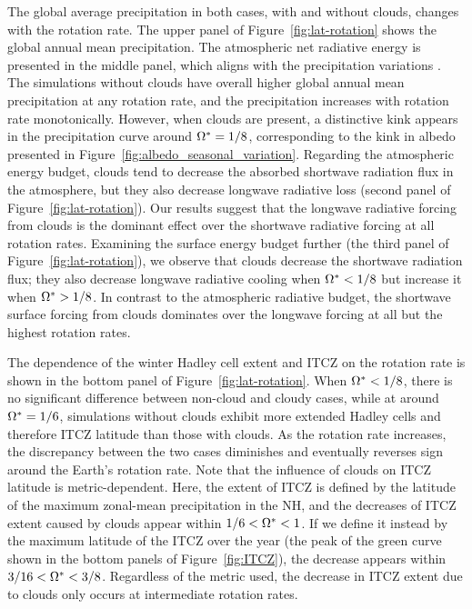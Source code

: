 The global average precipitation in both cases, with and without clouds, changes with the rotation rate. The upper panel of Figure~\ref{fig:lat-rotation} shows the global annual mean precipitation. The atmospheric net radiative energy is presented in the middle panel, which aligns with the precipitation variations \citep{ogorman2008-Hydrological}. The simulations without clouds have overall higher global annual mean precipitation at any rotation rate, and the precipitation increases with rotation rate monotonically. However, when clouds are present, a distinctive kink appears in the precipitation curve around $\Omega^* = 1/8$, corresponding to the kink in albedo presented in Figure~\ref{fig:albedo_seasonal_variation}. Regarding the atmospheric energy budget, clouds tend to decrease the absorbed shortwave radiation flux in the atmosphere, but they also decrease longwave radiative loss (second panel of Figure~\ref{fig:lat-rotation}). Our results suggest that the longwave radiative forcing from clouds is the dominant effect over the shortwave radiative forcing at all rotation rates. Examining the surface energy budget further (the third panel of Figure~\ref{fig:lat-rotation}), we observe that clouds decrease the shortwave radiation flux; they also decrease longwave radiative cooling when $\Omega^*<1/8$ but increase it when $\Omega^*>1/8$. In contrast to the atmospheric radiative budget, the shortwave surface forcing from clouds dominates over the longwave forcing at all but the highest rotation rates. 


The dependence of the winter Hadley cell extent and ITCZ on the rotation rate is shown in the bottom panel of Figure~\ref{fig:lat-rotation}. When $\Omega^*<1/8$, there is no significant difference between non-cloud and cloudy cases, while at around $\Omega^*=1/6$, simulations without clouds exhibit more extended Hadley cells and therefore ITCZ latitude than those with clouds. As the rotation rate increases, the discrepancy between the two cases diminishes and eventually reverses sign around the Earth's rotation rate. Note that the influence of clouds on ITCZ latitude is metric-dependent. Here, the extent of ITCZ is defined by the latitude of the maximum zonal-mean precipitation in the NH, and the decreases of ITCZ extent caused by clouds appear within $1/6<\Omega^*<1$. If we define it instead by the maximum latitude of the ITCZ over the year (the peak of the green curve shown in the bottom panels of Figure~\ref{fig:ITCZ}), the decrease appears within $3/16<\Omega^*<3/8$. Regardless of the metric used, the decrease in ITCZ extent due to clouds only occurs at intermediate rotation rates.


